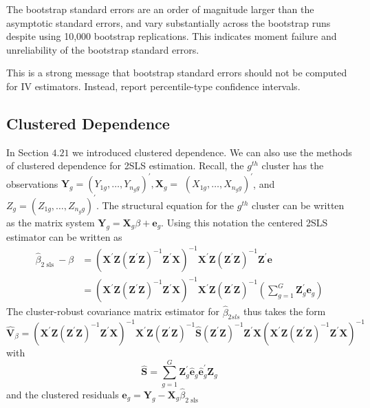 \documentclass[10pt]{article}
\begin{document}
The bootstrap standard errors are an order of magnitude larger than the asymptotic standard errors, and vary substantially across the bootstrap runs despite using 10,000 bootstrap replications. This indicates moment failure and unreliability of the bootstrap standard errors.

This is a strong message that bootstrap standard errors should not be computed for IV estimators. Instead, report percentile-type confidence intervals.

\subsection{Clustered Dependence}
In Section $4.21$ we introduced clustered dependence. We can also use the methods of clustered dependence for 2SLS estimation. Recall, the $g^{t h}$ cluster has the observations $\boldsymbol{Y}_{g}=\left(Y_{1 g}, \ldots, Y_{n_{g} g}\right)^{\prime}, \boldsymbol{X}_{g}=$ $\left(X_{1 g}, \ldots, X_{n_{g} g}\right)^{\prime}$, and $Z_{g}=\left(Z_{1 g}, \ldots, Z_{n_{g} g}\right)^{\prime}$. The structural equation for the $g^{t h}$ cluster can be written as the matrix system $\boldsymbol{Y}_{g}=\boldsymbol{X}_{g} \beta+\boldsymbol{e}_{g}$. Using this notation the centered 2SLS estimator can be written as
$$
\begin{aligned}
\widehat{\beta}_{2 \text { sls }}-\beta &=\left(\boldsymbol{X}^{\prime} \boldsymbol{Z}\left(\boldsymbol{Z}^{\prime} \boldsymbol{Z}\right)^{-1} \boldsymbol{Z}^{\prime} \boldsymbol{X}\right)^{-1} \boldsymbol{X}^{\prime} \boldsymbol{Z}\left(\boldsymbol{Z}^{\prime} \boldsymbol{Z}\right)^{-1} \boldsymbol{Z}^{\prime} \boldsymbol{e} \\
&=\left(\boldsymbol{X}^{\prime} \boldsymbol{Z}\left(\boldsymbol{Z}^{\prime} \boldsymbol{Z}\right)^{-1} \boldsymbol{Z}^{\prime} \boldsymbol{X}\right)^{-1} \boldsymbol{X}^{\prime} \boldsymbol{Z}\left(\boldsymbol{Z}^{\prime} \boldsymbol{Z}\right)^{-1}\left(\sum_{g=1}^{G} \boldsymbol{Z}_{g}^{\prime} \boldsymbol{e}_{g}\right)
\end{aligned}
$$
The cluster-robust covariance matrix estimator for $\widehat{\beta}_{2 s l s}$ thus takes the form
$$
\widehat{\boldsymbol{V}}_{\beta}=\left(\boldsymbol{X}^{\prime} \boldsymbol{Z}\left(\boldsymbol{Z}^{\prime} \boldsymbol{Z}\right)^{-1} \boldsymbol{Z}^{\prime} \boldsymbol{X}\right)^{-1} \boldsymbol{X}^{\prime} \boldsymbol{Z}\left(\boldsymbol{Z}^{\prime} \boldsymbol{Z}\right)^{-1} \widehat{\boldsymbol{S}}\left(\boldsymbol{Z}^{\prime} \boldsymbol{Z}\right)^{-1} \boldsymbol{Z}^{\prime} \boldsymbol{X}\left(\boldsymbol{X}^{\prime} \boldsymbol{Z}\left(\boldsymbol{Z}^{\prime} \boldsymbol{Z}\right)^{-1} \boldsymbol{Z}^{\prime} \boldsymbol{X}\right)^{-1}
$$
with
$$
\widehat{\boldsymbol{S}}=\sum_{g=1}^{G} \boldsymbol{Z}_{g}^{\prime} \widehat{\boldsymbol{e}}_{g} \widehat{\boldsymbol{e}}_{g}^{\prime} \boldsymbol{Z}_{g}
$$
and the clustered residuals $\widehat{\boldsymbol{e}}_{g}=\boldsymbol{Y}_{g}-\boldsymbol{X}_{g} \widehat{\beta}_{2 \text { sls }}$
\end{document}
